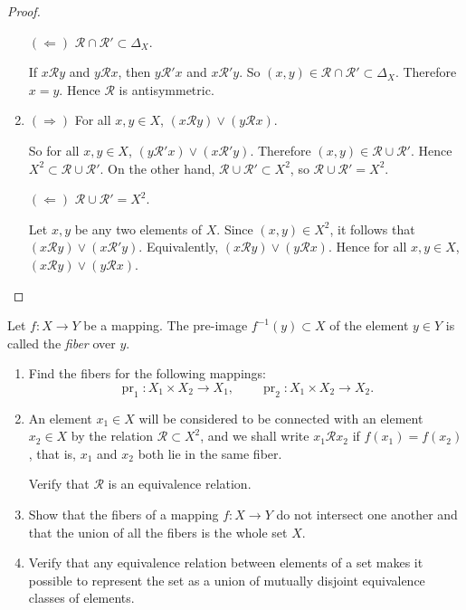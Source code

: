 \begin{proof}
\begin{enumerate}[label={(\alph*)}]
              $(\Leftarrow)$ $\mathcal{R}\cap\mathcal{R}'\subset \Delta_{X}$.

              If $x\mathcal{R}y$ and $y\mathcal{R}x$, then $y\mathcal{R}'x$ and $x\mathcal{R}'y$. So $(x, y)\in \mathcal{R}\cap\mathcal{R}'\subset \Delta_{X}$. Therefore $x = y$. Hence $\mathcal{R}$ is antisymmetric.
        \item $(\Rightarrow)$ For all $x, y\in X$, $(x\mathcal{R}y)\lor (y\mathcal{R}x)$.

              So for all $x, y\in X$, $(y\mathcal{R}'x)\lor (x\mathcal{R}'y)$. Therefore $(x, y)\in \mathcal{R}\cup \mathcal{R}'$. Hence $X^{2}\subset \mathcal{R}\cup \mathcal{R}'$. On the other hand, $\mathcal{R}\cup \mathcal{R}'\subset X^{2}$, so $\mathcal{R}\cup \mathcal{R}' = X^{2}$.

              $(\Leftarrow)$ $\mathcal{R}\cup \mathcal{R}' = X^{2}$.

              Let $x, y$ be any two elements of $X$. Since $(x, y) \in X^{2}$, it follows that $(x\mathcal{R}y) \lor (x\mathcal{R}'y)$. Equivalently, $(x\mathcal{R}y)\lor (y\mathcal{R}x)$. Hence for all $x, y\in X$, $(x\mathcal{R}y)\lor (y\mathcal{R}x)$.
    \end{enumerate}
\end{proof}
\newpage

\begin{exercise}
    Let $f: X\to Y$ be a mapping. The pre-image $f^{-1}(y)\subset X$ of the element $y\in Y$ is called the \textit{fiber} over $y$.
    \begin{enumerate}[label={(\alph*)}]
        \item Find the fibers for the following mappings:
              \[
                  \operatorname{pr}_{1}: X_{1}\times X_{2} \to X_{1},\qquad \operatorname{pr}_{2}: X_{1}\times X_{2} \to X_{2}.
              \]
        \item An element $x_{1}\in X$ will be considered to be connected with an element $x_{2}\in X$ by the relation $\mathcal{R}\subset X^{2}$, and we shall write $x_{1} \mathcal{R} x_{2}$ if $f(x_{1}) = f(x_{2})$, that is, $x_{1}$ and $x_{2}$ both lie in the same fiber.

              Verify that $\mathcal{R}$ is an equivalence relation.
        \item Show that the fibers of a mapping $f: X \to Y$ do not intersect one another and that the union of all the fibers is the whole set $X$.
        \item Verify that any equivalence relation between elements of a set makes it possible to represent the set as a union of mutually disjoint equivalence classes of elements.
    \end{enumerate}
\end{exercise}

